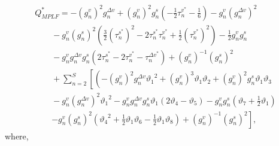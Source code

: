 \documentclass[journal]{IEEEtran}
\begin{document}
\begin{equation}
  \begin{array}{l}
    Q_{MPLF}^* =  - {\left( {g_n^v} \right)^2}g_n^{\Delta v} + {\left( {g_n^v} \right)^2}g_n^s\left( { - \frac{1}{2}\tau _n^{{v^*}} - \frac{1}{6}} \right) - g_n^v{\left( {g_n^{\Delta v}} \right)^2}                                                                 \\
    \quad \quad  - g_n^v{\left( {g_n^s} \right)^2}\left( {\frac{3}{2}{{\left( {\tau _n^{{s^*}}} \right)}^2} - 2\tau _n^{{s^*}}\tau _n^{{v^*}} + \frac{1}{2}{{\left( {\tau _n^{{v^*}}} \right)}^2}} \right) - \frac{1}{2}g_n^vg_n^s                                    \\
    \quad \quad  - g_n^vg_n^{\Delta v}g_n^s\left( {2\tau _n^{{s^*}} - 2\tau _n^{{v^*}} - \tau _n^{\Delta {v^*}}} \right) + {\left( {g_n^v} \right)^{ - 1}}{\left( {g_n^s} \right)^2}                                                                                  \\
    \quad \quad  + \sum\limits_{n = 2}^S {\left[ {\left( { - {{\left( {g_n^v} \right)}^2}g_n^{\Delta v}{\vartheta _1}^2 + {{\left( {g_n^v} \right)}^3}{\vartheta _1}{\vartheta _2} + {{\left( {g_n^v} \right)}^2}g_n^s{\vartheta _1}{\vartheta _3}} \right.} \right.} \\
    \quad \quad  - g_n^v{\left( {g_n^{\Delta v}} \right)^2}{\vartheta _1}^2 - g_n^vg_n^{\Delta v}g_n^s{\vartheta _1}\left( {2{\vartheta _4} - {\vartheta _5}} \right) - g_n^vg_n^s\left( {{\vartheta _7} + \frac{1}{2}{\vartheta _1}} \right)                         \\
    \quad \quad \left. { - g_n^v{{\left( {g_n^s} \right)}^2}\left( {{\vartheta _4}^2 + \frac{1}{2}{\vartheta _1}{\vartheta _6} - \frac{1}{2}{\vartheta _1}{\vartheta _8}} \right) + {{\left( {g_n^v} \right)}^{ - 1}}{{\left( {g_n^s} \right)}^2}} \right],
  \end{array}
\end{equation}
where,
\end{document}
